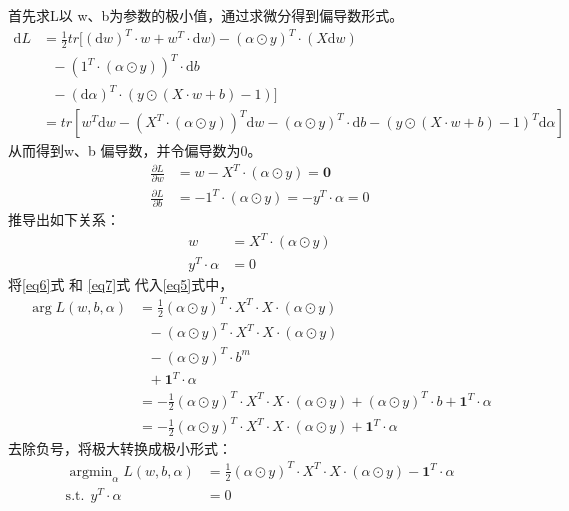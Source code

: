 \documentclass[12pt, a4paper, oneside]{ctexart}
\begin{document}
首先求L以 w、b为参数的极小值，通过求微分得到偏导数形式。
\begin{align}
    \mathrm{d}L &= \frac{1}{2}tr[(\mathrm{d}w)^T \cdot w + w^T \cdot \mathrm{d}w) - (\alpha \odot y) ^T \cdot(X\mathrm{d}w) \nonumber \\
                & \ \ \  - (1^T\cdot(\alpha \odot y)) ^T \cdot \mathrm{d}b \nonumber\\
                & \ \ \  - (\mathrm{d}\alpha)^T \cdot (y \odot (X \cdot w + b) - 1)] \nonumber \\
                &= tr[w^T\mathrm{d}w - (X^T\cdot(\alpha \odot y))^T\mathrm{d}w - (\alpha \odot y) ^T \cdot \mathrm{d}b - (y \odot (X \cdot w + b) - 1)^T\mathrm{d}\alpha] \nonumber
\end{align}
从而得到w、b 偏导数，并令偏导数为0。
\begin{align}
    \frac{\partial L}{\partial w} &= w - X^T\cdot(\alpha \odot y) = \boldsymbol{0} \nonumber \\
    \frac{\partial L}{\partial b} &= - 1^T\cdot(\alpha \odot y) = - y^T \cdot \alpha = 0  \nonumber
\end{align}
推导出如下关系：
\begin{align}
    w &= X^T\cdot(\alpha \odot y) \label{eq6} \\
    y^T \cdot \alpha &= 0 \label{eq7}
\end{align}
将\eqref{eq6}式 和 \eqref{eq7}式 代入\eqref{eq5}式中，
\begin{align}
    \mathop{\arg\max_{\alpha}} L(w, b, {\alpha}) &= \frac{1}{2}(\alpha \odot y)^T \cdot X^T \cdot X \cdot (\alpha \odot y) \nonumber \\
                      & \ \ \  - (\alpha \odot y)^T \cdot X^T \cdot X \cdot (\alpha \odot y) \nonumber \\
                      & \ \ \  - (\alpha \odot y)^T \cdot b^m  \nonumber \\
                      & \ \ \  + \boldsymbol{1}^T\cdot\alpha  \nonumber \\
                      &= -\frac{1}{2}(\alpha \odot y)^T \cdot X^T \cdot X \cdot (\alpha \odot y) + (\alpha \odot y)^T \cdot b + \boldsymbol{1}^T\cdot\alpha \nonumber \\
                      &= -\frac{1}{2}(\alpha \odot y)^T \cdot X^T \cdot X \cdot (\alpha \odot y) + \boldsymbol{1}^T\cdot\alpha \nonumber 
\end{align}
去除负号，将极大转换成极小形式：
\begin{align}
    \mathop{\arg\min}_{\alpha} L(w, b, {\alpha}) &= \frac{1}{2}(\alpha \odot y)^T \cdot X^T \cdot X \cdot (\alpha \odot y) - \boldsymbol{1}^T\cdot\alpha \label{eq8} \\
        \mathrm{ s.t. }\ \   y^T \cdot \alpha &= 0 \nonumber 
\end{align}
\end{document}
